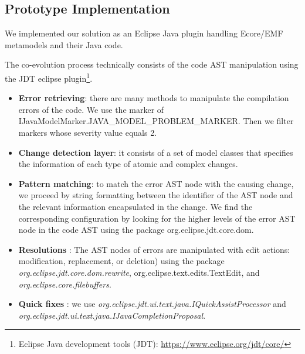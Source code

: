 	
	
	
	
	
	
	
	
	\subsection{Prototype Implementation}
	We implemented our solution as an Eclipse Java plugin handling Ecore/EMF metamodels and their Java code. 
	
	The co-evolution process technically consists of the code AST manipulation using the JDT eclipse plugin\footnote{Eclipse Java development tools (JDT): \url{https://www.eclipse.org/jdt/core/}}.
	\begin{itemize}
		\item \textbf{Error retrieving}: there are many methods to manipulate the compilation errors of the code. We use the marker of IJavaModelMarker.JAVA\_MODEL\_PROBLEM\_MARKER. Then we filter markers whose severity value equals 2.
		\item \textbf{Change detection layer}: it consists of a set of model classes that specifies the information of each type of atomic and complex changes. 
		\item \textbf{Pattern matching}: to match the error AST node with the causing change, we proceed by string formatting between the identifier of the AST node and the relevant information encapsulated in the change. We find the corresponding configuration by looking for the higher levels of the error AST node in the code AST using the package org.eclipse.jdt.core.dom.
		\item \textbf{Resolutions} :
		The AST nodes of errors are manipulated with edit actions: modification, replacement, or deletion)  
		using the package \textit{ org.eclipse.jdt.core.dom.rewrite}, org.eclipse.text.edits.TextEdit, and \textit{org.eclipse.core.filebuffers}. 
		\item \textbf{Quick fixes} : we use \textit{org.eclipse.jdt.ui.text.java.IQuickAssistProcessor} and \textit{org.eclipse.jdt.ui.text.java.IJavaCompletionProposal}.
		
	\end{itemize}
	
